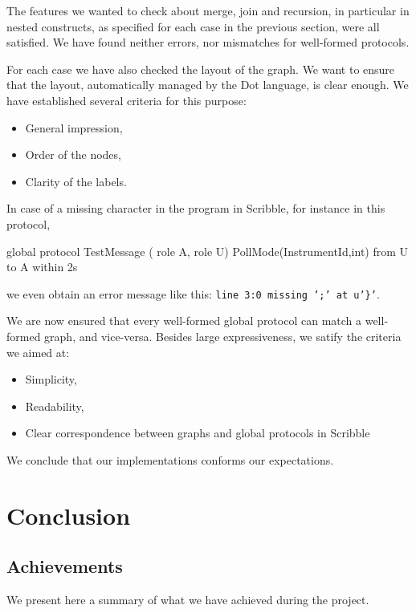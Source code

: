 \documentclass[a4paper,11pt,twoside]{report}
\begin{document}
The features we wanted to check about merge, join and recursion, in particular in nested constructs, as specified for each case in the previous section, were all satisfied. We have found neither errors, nor mismatches for well-formed protocols.

For each case we have also checked the layout of the graph. We want to ensure that the layout, automatically managed by the Dot language, is clear enough. We have established several criteria for this purpose:
\begin{itemize}
\item General impression,
\item Order of the nodes,
\item Clarity of the labels.
\end{itemize}

In case of a missing character in the program in Scribble, for instance in this protocol,
\begin{SJLISTING}
global protocol TestMessage ( role A, role U) {
 PollMode(InstrumentId,int) from U to A within 2s
}
\end{SJLISTING}
we even obtain an error message like this: \texttt{line 3:0 missing ';' at u'\}'}.

We are now ensured that every well-formed global protocol can match a well-formed graph, and vice-versa. Besides large expressiveness, we satify the criteria we aimed at:
\begin{itemize}
\item Simplicity,
\item Readability,
\item Clear correspondence between graphs and global protocols in Scribble
\end{itemize}
We conclude that our implementations conforms our expectations.

\chapter*{Conclusion}

\section*{Achievements}
We present here a summary of what we have achieved during the project.
\end{document}
